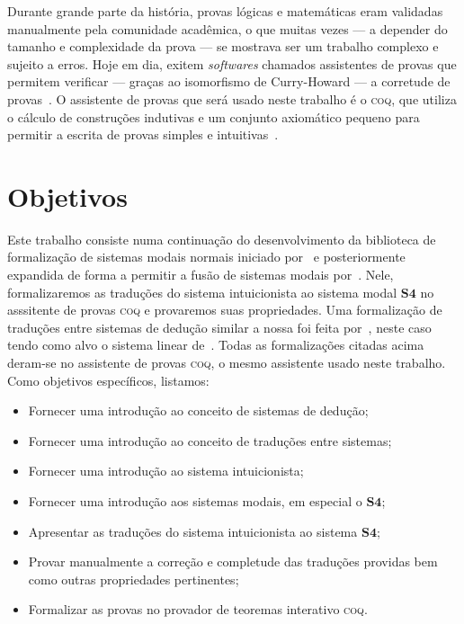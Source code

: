Durante grande parte da história, provas lógicas e matemáticas eram validadas manualmente pela comunidade acadêmica, o que muitas vezes --- a depender do tamanho e complexidade da prova --- se mostrava ser um trabalho complexo e sujeito a erros. Hoje em dia, exitem \textit{softwares} chamados assistentes de provas que permitem verificar --- graças ao isomorfismo de Curry-Howard --- a corretude de provas~\citep{Chlipala}. O assistente de provas que será usado neste trabalho é o \textsc{coq}, que utiliza o cálculo de construções indutivas e um conjunto axiomático pequeno para permitir a escrita de provas simples e intuitivas~\citep{Coq}.

    \section{Objetivos}
    Este trabalho consiste numa continuação do desenvolvimento da biblioteca de formalização de sistemas modais normais iniciado por~\cite{Silveira} e posteriormente expandida de forma a permitir a fusão de sistemas modais por~\cite{Nunes}. Nele, formalizaremos as traduções do sistema intuicionista ao sistema modal $\mathbf{S4}$ no asssitente de provas \textsc{coq} e provaremos suas propriedades. Uma formalização de traduções entre sistemas de dedução similar a nossa foi feita por~\cite{Sehnem}, neste caso tendo como alvo o sistema linear de~\cite{Girard}. Todas as formalizações citadas acima deram-se no assistente de provas \textsc{coq}, o mesmo assistente usado neste trabalho. Como objetivos específicos, listamos:

    \begin{itemize}
        \item Fornecer uma introdução ao conceito de sistemas de dedução;
        \item Fornecer uma introdução ao conceito de traduções entre sistemas;
        \item Fornecer uma introdução ao sistema intuicionista;
        \item Fornecer uma introdução aos sistemas modais, em especial o $\mathbf{S4}$;
        \item Apresentar as traduções do sistema intuicionista ao sistema $\mathbf{S4}$;
        \item Provar manualmente a correção e completude das traduções providas bem como outras propriedades pertinentes;
        \item Formalizar as provas no provador de teoremas interativo \textsc{coq}.
    \end{itemize}

